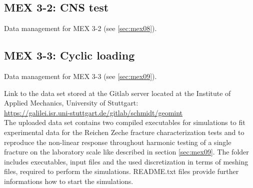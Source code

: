\subsection{MEX 3-2: CNS test}

Data management for MEX 3-2 (see \ref{sec:mex08}).

\subsection{MEX 3-3: Cyclic loading}

Data management for MEX 3-3 (see \ref{sec:mex09}).

Link to the data set stored at the Gitlab server located at the Institute of Applied Mechanics, University of Stuttgart:\\
\hyperlink{https://galilei.isr.uni-stuttgart.de/gitlab/schmidt/geomint}{https://galilei.isr.uni-stuttgart.de/gitlab/schmidt/geomint}\\

The uploaded data set contains two compiled executables for simulations to fit experimental data for the Reichen Zeche fracture characterization tests and to reproduce the non-linear response throughout harmonic testing of a single fracture on the laboratory scale like described in section \ref{sec:mex09}. The folder includes executables, input files and the used discretization in terms of meshing files, required to perform the simulations. README.txt files provide further informations how to start the simulations.